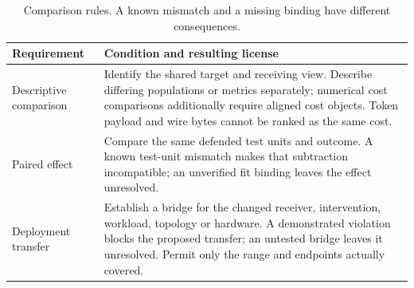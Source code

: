 \begin{table}[t]\centering\footnotesize
\caption{Comparison rules. A known mismatch and a missing binding have different consequences.}\label{tab:comparison-contracts}
\begin{tabularx}{\columnwidth}{@{}p{}Y@{}}\toprule
Requirement & Condition and resulting license\\\midrule
Descriptive comparison & Identify the shared target and receiving view. Describe differing populations or metrics separately; numerical cost comparisons additionally require aligned cost objects. Token payload and wire bytes cannot be ranked as the same cost.\\
Paired effect & Compare the same defended test units and outcome. A known test-unit mismatch makes that subtraction incompatible; an unverified fit binding leaves the effect unresolved.\\
Deployment transfer & Establish a bridge for the changed receiver, intervention, workload, topology or hardware. A demonstrated violation blocks the proposed transfer; an untested bridge leaves it unresolved. Permit only the range and endpoints actually covered.\\\bottomrule
\end{tabularx}\end{table}
